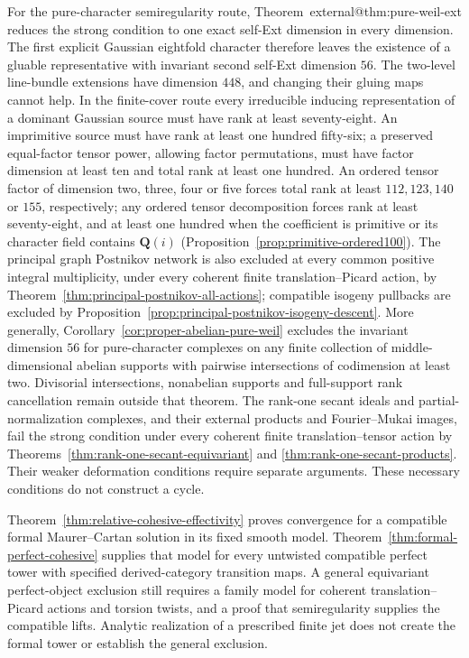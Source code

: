 \documentclass[11pt]{article}
\makeatletter
\providecommand{\compref}[1]{\csname external@#1\endcsname}
\theoremstyle{definition}
\theoremstyle{remark}
\newcommand{\Q}{\mathbf Q}
\makeatother
\begin{document}
For the pure-character semiregularity route, Theorem~\compref{thm:pure-weil-ext} reduces the strong condition to one exact self-Ext dimension in every dimension. The first explicit Gaussian eightfold character therefore leaves the existence of a gluable representative with invariant second self-Ext dimension $56$. The two-level line-bundle extensions have dimension $448$, and changing their gluing maps cannot help. In the finite-cover route every irreducible inducing
representation of a dominant Gaussian source must have rank at
least seventy-eight. An imprimitive source must have rank at least
one hundred fifty-six; a preserved equal-factor tensor power, allowing factor
permutations, must have factor dimension at least ten and total
rank at least one hundred. An ordered tensor factor of dimension
two, three, four or five forces total rank at least
$112,123,140$ or $155$, respectively; any ordered tensor
decomposition forces rank at least seventy-eight, and at least one
hundred when the coefficient is primitive or its character field
contains $\Q(i)$ (Proposition~\ref{prop:primitive-ordered100}).
The principal graph Postnikov network is also excluded at every
common positive integral multiplicity, under every coherent finite
translation--Picard action, by
Theorem~\ref{thm:principal-postnikov-all-actions}; compatible
isogeny pullbacks are excluded by
Proposition~\ref{prop:principal-postnikov-isogeny-descent}.
More generally, Corollary~\ref{cor:proper-abelian-pure-weil}
excludes the invariant dimension $56$ for pure-character complexes
on any finite collection of middle-dimensional abelian supports
with pairwise intersections of codimension at least two. Divisorial
intersections, nonabelian supports and full-support rank cancellation
remain outside that theorem.
The rank-one secant ideals and partial-normalization complexes,
and their external products and Fourier--Mukai images, fail the
strong condition under every coherent finite translation--tensor
action by Theorems~\ref{thm:rank-one-secant-equivariant} and
\ref{thm:rank-one-secant-products}. Their weaker deformation
conditions require separate arguments. These necessary conditions
do not construct a cycle.


Theorem~\ref{thm:relative-cohesive-effectivity} proves convergence
for a compatible formal Maurer--Cartan solution in its fixed
smooth model. Theorem~\ref{thm:formal-perfect-cohesive} supplies
that model for every untwisted compatible perfect tower with
specified derived-category transition maps. A general equivariant
perfect-object exclusion still requires a family model for coherent
translation--Picard actions and torsion twists, and a proof that
semiregularity supplies the compatible lifts. Analytic realization
of a prescribed finite jet does not create the formal tower or
establish the general exclusion.
\end{document}
